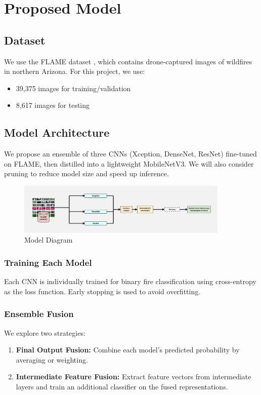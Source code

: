 \section{Proposed Model}
\label{sec:proposed-model}

\subsection{Dataset}
\label{subsec:dataset}

We use the FLAME dataset \cite{FLAME_Dataset}, which contains drone-captured images
of wildfires in northern Arizona.
For this project, we use:
\begin{itemize}
    \item 39,375 images for training/validation
    \item 8,617 images for testing
\end{itemize}

\subsection{Model Architecture}
\label{subsec:model-architecture}

We propose an ensemble of three CNNs (Xception, DenseNet, ResNet) fine-tuned on FLAME,
then distilled into a lightweight MobileNetV3. We will also consider pruning to reduce
model size and speed up inference.

\begin{figure}[h]
    \centering
    \includegraphics[width=0.9\textwidth]{images/model}
    \caption{Model Diagram}
    \label{fig:model}
\end{figure}

\subsubsection{Training Each Model}
Each CNN is individually trained for binary fire classification using cross-entropy     as the loss function.
Early stopping is used to avoid overfitting.

\subsubsection{Ensemble Fusion}
We explore two strategies:
\begin{enumerate}
    \item \textbf{Final Output Fusion:} Combine each model’s predicted probability by averaging or weighting.
    \item \textbf{Intermediate Feature Fusion:} Extract feature vectors from intermediate layers and train an additional classifier on the fused representations.
\end{enumerate}


